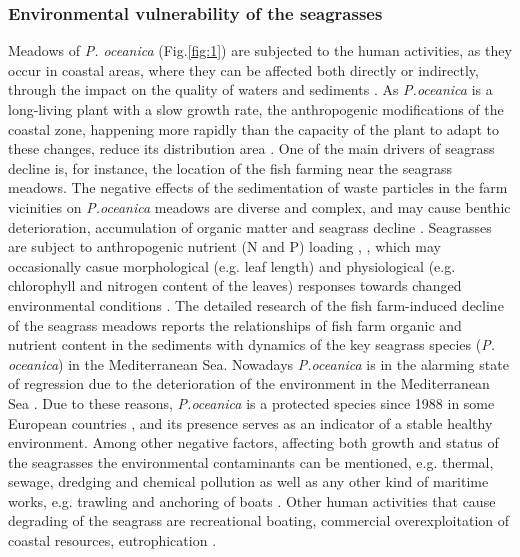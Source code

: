 \documentclass[11pt]{article}
\begin{document}
\subsubsection{Environmental vulnerability of the seagrasses}
Meadows of \textit{P. oceanica} (Fig.\ref{fig:1})\label{page-3} are subjected to the human activities, as they occur in coastal areas, where
they can be affected both directly \cite{Meinesz91}\label{Meinesz91} or indirectly, through the impact on the
quality of waters and sediments \cite{Duarte02}\label{Duarte02}. As \textit{P.oceanica} is a long-living plant with a slow
growth rate, the anthropogenic modifications of the coastal zone, happening more rapidly than the
capacity of the plant to adapt to these changes, reduce its distribution area \cite{Micheli05}\label{Micheli05}. 
One of the main drivers of seagrass decline is, for instance, the location of the fish farming near the
seagrass meadows. The negative effects of the sedimentation of waste particles in the farm vicinities
on \textit{P.oceanica} meadows are diverse and complex, and may cause benthic deterioration, accumulation
of organic matter and seagrass decline \cite{Holmer08}\label{Holmer08}. Seagrasses are subject to anthropogenic
nutrient (N and P) loading \cite{Cambridge09}\label{Cambridge09}, \cite{Leoni08}\label{Leoni08}, which may occasionally casue morphological (e.g. leaf length) and physiological (e.g. chlorophyll and nitrogen content of the leaves) responses towards changed
environmental conditions \cite{Leoni06,Leoni07}\label{Leoni06}\label{Leoni07}. 
The detailed research of the fish farm-induced decline of the seagrass meadows \cite{Diaz-Almela06}\label{Diaz-Almela06}reports the relationships of
fish farm organic and nutrient content in the sediments with dynamics of the key seagrass species (\textit{P.
oceanica}) in the Mediterranean Sea. Nowadays \textit{P.oceanica} is in the alarming state of regression due
to the deterioration of the environment in the Mediterranean Sea \cite{Ribed02}\label{Ribed02}. Due to these reasons,
\textit{P.oceanica} is a protected species since 1988 in some European countries \cite{Francour99}\label{Francour99}, and
its presence serves as an indicator of a stable healthy environment. Among other negative factors,
affecting both growth and status of the seagrasses the environmental contaminants can be mentioned,
e.g. thermal, sewage, dredging and chemical pollution  as well as any other kind of maritime works,
e.g. trawling and anchoring of boats \cite{Ribed02}\label{Ribed02}. Other human activities that cause degrading of the
seagrass are recreational boating, commercial overexploitation of coastal resources, eutrophication
\cite{McKenzie06}\label{McKenzie06}.
\end{document}
